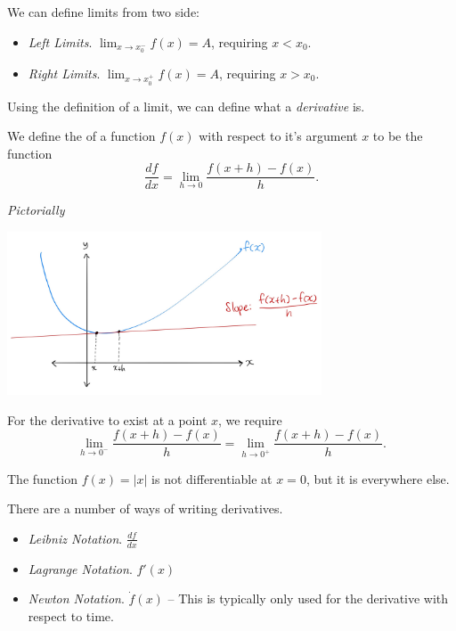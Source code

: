 \documentclass[a4]{scrartcl}
\begin{document}
We can define limits from two side:
\begin{itemize}
	\item \emph{Left Limits}. $\lim_{x \to x_0^-} f(x) = A$, requiring $x < x_0$.
	\item \emph{Right Limits}. $\lim_{x \to x_0^+} f(x) = A$, requiring $x > x_0$.
\end{itemize}

Using the definition of a limit, we can define what a \emph{derivative} is.

\begin{definition}[Derivatives]
	We define the  of a function $f(x)$ with respect to it's argument $x$ to be the function
	$$
	\frac{df}{dx} = \lim_{h \to 0} \frac{f(x + h) - f(x)}{h}.
	$$
\end{definition}

\emph{Pictorially}

\begin{center}
	\includegraphics[width=0.7\textwidth]{derivative.jpg}
\end{center}

For the derivative to exist at a point $x$, we require
$$
\lim_{h \to 0^-} \frac{f(x + h) - f(x)}{h} = \lim_{h \to 0^+} \frac{f(x + h) - f(x)}{h}.
$$

\begin{example}
	The function $f(x) = |x|$ is not differentiable at $x = 0$, but it is everywhere else.
\end{example}

There are a number of ways of writing derivatives.
\begin{itemize}
	\item \emph{Leibniz Notation}. $\frac{df}{dx}$
	\item \emph{Lagrange Notation}. $f'(x)$
	\item \emph{Newton Notation}. $\dot{f}(x)$ -- This is typically only used for the derivative with respect to time.
\end{itemize}
\end{document}
